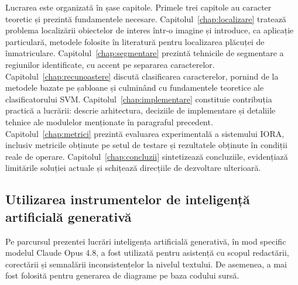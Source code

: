 Lucrarea este organizată în șase capitole. Primele trei capitole au caracter
teoretic și prezintă fundamentele necesare.
Capitolul~\ref{chap:localizare} tratează problema localizării obiectelor de
interes într-o imagine și introduce, ca aplicație particulară, metodele
folosite în literatură pentru localizarea plăcuței de înmatriculare.
Capitolul~\ref{chap:segmentare} prezintă tehnicile de segmentare a regiunilor
identificate, cu accent pe separarea caracterelor.
Capitolul~\ref{chap:recunoastere} discută clasificarea caracterelor, pornind
de la metodele bazate pe șabloane și culminând cu fundamentele teoretice ale
clasificatorului SVM. Capitolul~\ref{chap:implementare} constituie contribuția
practică a lucrării: descrie arhitectura, deciziile de implementare și detaliile tehnice ale modulelor menționate în paragraful precedent. Capitolul~\ref{chap:metrici} prezintă evaluarea experimentală a sistemului \textsc{IORA}, inclusiv metricile
obținute pe setul de testare și rezultatele obținute în condiții reale de
operare. Capitolul~\ref{chap:concluzii} sintetizează concluziile, evidențiază
limitările soluției actuale și schițează direcțiile de dezvoltare ulterioară.

\subsection{Utilizarea instrumentelor de inteligență artificială generativă}
\indent\par
Pe parcursul prezentei lucrări inteligența artificială generativă, în mod specific modelul Claude Opus 4.8, a fost utilizată pentru asistență cu scopul redactării, corectării și semnalării inconsistențelor la nivelul textului. De asemenea, a mai fost folosită pentru generarea de diagrame pe baza codului sursă.
